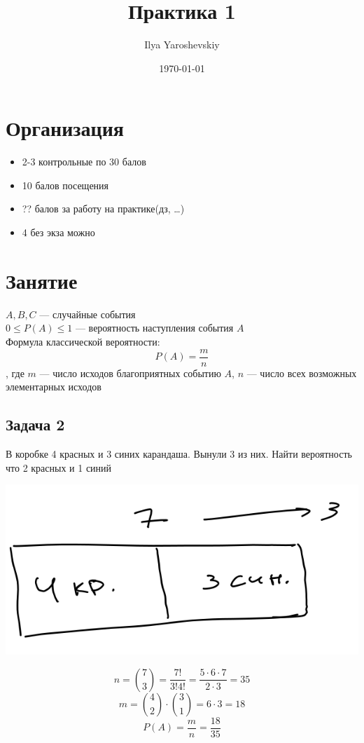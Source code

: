 \documentclass[english]{article}
\author{Ilya Yaroshevskiy}
\date{\today}
\title{Практика 1}
\theoremstyle{plain}
\theoremstyle{remark}
\theoremstyle{definition}
\begin{document}
\maketitle
\tableofcontents


\section{Организация}
\label{sec:org22a708f}
\begin{itemize}
\item 2-3 контрольные по 30 балов
\item 10 балов посещения
\item ?? балов за работу на практике(дз, \ldots{})
\item 4 без экза можно
\end{itemize}

\section{Занятие}
\label{sec:org65ead7b}
\(A, B, C\) --- случайные события \\
\(0 \le P(A) \le 1\) --- вероятность наступления события \(A\) \\
Формула классической вероятности:
\[ P(A) = \frac{m}{n} \]
, где \(m\) --- число исходов благоприятных событию \(A\), \(n\) --- число всех возможных элементарных исходов

\subsection{Задача 2}
\label{sec:org753a419}
В коробке 4 красных и 3 синих карандаша. Вынули 3 из них. Найти вероятность что 2 красных и 1 синий

\begin{center}
\includegraphics[width=.9\linewidth]{1_2.png}
\end{center}

\[ n = \binom{7}{3} = \frac{7!}{3!4!} = \frac{5\cdot 6 \cdot 7}{2 \cdot 3} = 35 \]
\[ m = \binom{4}{2} \cdot \binom{3}{1} = 6\cdot 3 = 18 \]
\[ P(A) = \frac{m}{n} = \frac{18}{35} \]
\end{document}
